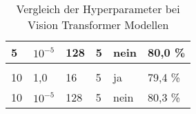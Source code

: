 \begin{table}[!htb]
\begin{tabular}{llllll}
\multicolumn{1}{|l|}{5}                               & \multicolumn{1}{l|}{$10^{-5}$}                             & \multicolumn{1}{l|}{128}                                 & \multicolumn{1}{l|}{5}                                                                                & \multicolumn{1}{l|}{nein}                                                                                   & \multicolumn{1}{l|}{80,0 \%}                             \\ \hline
                                                      &                                                            &                                                          &                                                                                                       &                                                                                                             &                                                          \\ \hline
\multicolumn{1}{|l|}{10}                              & \multicolumn{1}{l|}{1,0}                                   & \multicolumn{1}{l|}{16}                                  & \multicolumn{1}{l|}{5}                                                                                & \multicolumn{1}{l|}{ja}                                                                                     & \multicolumn{1}{l|}{79,4 \%}                             \\ \hline
\multicolumn{1}{|l|}{10}                              & \multicolumn{1}{l|}{$10^{-5}$}                             & \multicolumn{1}{l|}{128}                                 & \multicolumn{1}{l|}{5}                                                                                & \multicolumn{1}{l|}{nein}                                                                                   & \multicolumn{1}{l|}{80,3 \%}                             \\ \hline
\end{tabular}
\caption{Vergleich der Hyperparameter bei Vision Transformer Modellen}
\label{tab:vit_comp1}
\end{table}